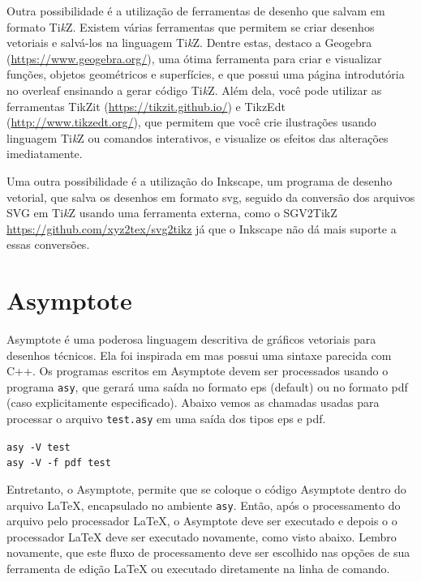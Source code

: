 Outra possibilidade é a utilização de ferramentas de desenho que salvam em formato Ti\textit{k}Z. Existem várias ferramentas que permitem se criar desenhos vetoriais e salvá-los na linguagem Ti\textit{k}Z. Dentre estas, destaco a Geogebra (\url{https://www.geogebra.org/}), uma ótima ferramenta para criar e visualizar funções, objetos geométricos e superfícies, e que possui uma página introdutória no \gls{overleaf} ensinando a gerar código Ti\textit{k}Z. Além dela, você pode utilizar as ferramentas TikZit (\url{https://tikzit.github.io/}) e TikzEdt (\url{http://www.tikzedt.org/}), que permitem que você crie ilustrações usando linguagem Ti\textit{k}Z ou comandos interativos, e visualize os efeitos das alterações imediatamente.

Uma outra possibilidade é a utilização do Inkscape, um programa de desenho vetorial, que salva os desenhos em formato \gls{svg}, seguido da conversão dos arquivos SVG em Ti\textit{k}Z usando uma ferramenta externa, como o SGV2TikZ \url{https://github.com/xyz2tex/svg2tikz} já que o Inkscape não dá mais suporte a essas conversões.

\section{Asymptote} \label{asymptote}

Asymptote é uma poderosa linguagem descritiva de gráficos vetoriais para desenhos técnicos. Ela foi inspirada em  mas possui uma sintaxe parecida com C++. Os programas escritos em Asymptote devem ser processados usando o programa \texttt{asy}, que gerará uma saída no formato \gls{eps} (default) ou no formato \gls{pdf} (caso explicitamente especificado). Abaixo vemos as chamadas usadas para processar o arquivo \texttt{test.asy} em uma saída dos tipos \gls{eps} e \gls{pdf}. 

\begin{adjustbox}{fbox, center, tabular=l, vspace=0.5cm}
	\texttt{asy -V test} \\
	\texttt{asy -V -f pdf test}
\end{adjustbox}

Entretanto, o Asymptote, permite que se coloque o código Asymptote dentro do arquivo \LaTeX{}, encapsulado no ambiente \texttt{asy}. Então, após o processamento do arquivo pelo processador \LaTeX{}, o Asymptote deve ser executado e depois o o processador \LaTeX{} deve ser executado novamente, como visto abaixo. Lembro novamente, que este fluxo de processamento deve ser escolhido nas opções de sua ferramenta de edição \LaTeX{} ou executado diretamente na linha de comando. 

